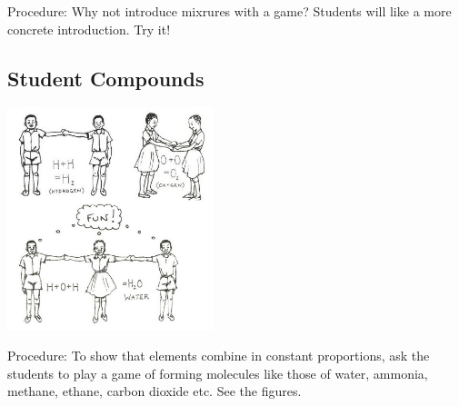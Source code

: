 \begin{multicols}{2}
\begin{description*}
\item[Procedure:]{Why not introduce mixrures with a
game? Students will like a more concrete
introduction. Try it!}
\end{description*}

\subsection{Student Compounds}

\begin{center}
\includegraphics[width=0.45\textwidth]{./img/source/student-compounds.jpg}
\end{center}

\begin{description*}
\item[Procedure:]{To show that elements combine in constant
proportions, ask the students to play a game of
forming molecules like those of water, ammonia,
methane, ethane, carbon dioxide etc. See the
figures.}
\end{description*}


\end{multicols}
